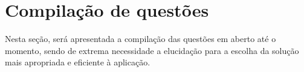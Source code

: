 \section{Compilação de questões}\label{sec:questoes}
Nesta seção, será apresentada a compilação das questões em aberto até o momento,
sendo de extrema necessidade a elucidação para a escolha da solução mais
apropriada e eficiente à aplicação. 

